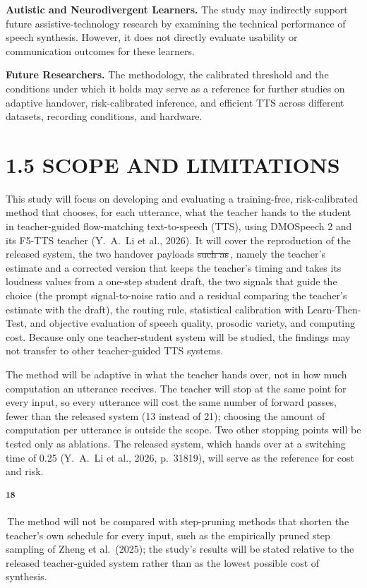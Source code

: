 \documentclass[11pt,a4paper]{article}
\newcommand{\chg}[2]{{\color{delcol}\sout{#1}}\,{\color{addcol}#2}}
\newcommand{\add}[1]{{\color{addcol}#1}}
\newcommand{\flag}[2]{\colorbox{flagcol}{\strut\textsuperscript{\bfseries #1}}\,{#2}}
\begin{document}
\textbf{Autistic and Neurodivergent Learners.} The study may indirectly support future assistive-technology research by examining the technical performance of speech synthesis. However, it does not directly evaluate usability or communication outcomes for these learners.

\textbf{Future Researchers.} The methodology, the calibrated threshold and the conditions under which it holds may serve as a reference for further studies on adaptive handover, risk-calibrated inference, and efficient TTS across different datasets, recording conditions, and hardware.

\section*{1.5 SCOPE AND LIMITATIONS}
This study will focus on developing and evaluating a training-free, risk-calibrated method that chooses, for each utterance, what the teacher hands to the student in teacher-guided flow-matching text-to-speech (TTS), using DMOSpeech 2 and its F5-TTS teacher (Y.\ A.\ Li et al., 2026). It will cover the reproduction of the released system, the two handover payloads\chg{ such as}{, namely} the teacher's estimate and a corrected version that keeps the teacher's timing and takes its loudness values from a one-step student draft, the two signals that guide the choice (the prompt signal-to-noise ratio and a residual comparing the teacher's estimate with the draft), the routing rule, statistical calibration with Learn-Then-Test, and objective evaluation of speech quality, prosodic variety, and computing cost. Because only one teacher-student system will be studied, the findings may not transfer to other teacher-guided TTS systems.

The method will be adaptive in what the teacher hands over, not in how much computation an utterance receives. The teacher will stop at the same point for every input, so every utterance will cost the same number of forward passes, fewer than the released system\add{ (13 instead of 21)}; choosing the amount of computation per utterance is outside the scope.\add{ Two other stopping points will be tested only as ablations.} The released system, which hands over at a switching time of 0.25 (Y.\ A.\ Li et al., 2026, p.~31819), will serve as the reference for cost and risk. \flag{18}{The method will not be compared with step-pruning methods that shorten the teacher's own schedule for every input, such as the empirically pruned step sampling of Zheng et al.\ (2025); the study's results will be stated relative to the released teacher-guided system rather than as the lowest possible cost of synthesis.}
\end{document}

